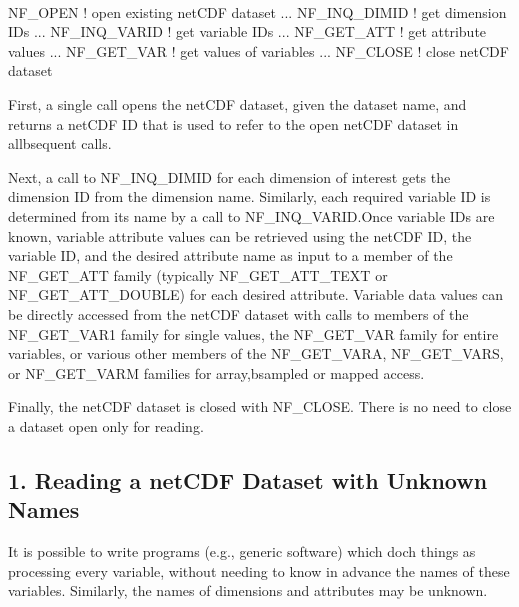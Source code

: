  

\begin{DoxyVerb}NF_OPEN               ! open existing netCDF dataset
     ...
   NF_INQ_DIMID       ! get dimension IDs
     ...
   NF_INQ_VARID       ! get variable IDs
     ...
   NF_GET_ATT         ! get attribute values
     ...
   NF_GET_VAR         ! get values of variables
     ...
NF_CLOSE              ! close netCDF dataset
\end{DoxyVerb}


First, a single call opens the net\+C\+DF dataset, given the dataset name, and returns a net\+C\+DF ID that is used to refer to the open net\+C\+DF dataset in allbsequent calls.

Next, a call to N\+F\+\_\+\+I\+N\+Q\+\_\+\+D\+I\+M\+ID for each dimension of interest gets the dimension ID from the dimension name. Similarly, each required variable ID is determined from its name by a call to N\+F\+\_\+\+I\+N\+Q\+\_\+\+V\+A\+R\+I\+D.\+Once variable I\+Ds are known, variable attribute values can be retrieved using the net\+C\+DF ID, the variable ID, and the desired attribute name as input to a member of the N\+F\+\_\+\+G\+E\+T\+\_\+\+A\+TT family (typically N\+F\+\_\+\+G\+E\+T\+\_\+\+A\+T\+T\+\_\+\+T\+E\+XT or N\+F\+\_\+\+G\+E\+T\+\_\+\+A\+T\+T\+\_\+\+D\+O\+U\+B\+LE) for each desired attribute. Variable data values can be directly accessed from the net\+C\+DF dataset with calls to members of the N\+F\+\_\+\+G\+E\+T\+\_\+\+V\+A\+R1 family for single values, the N\+F\+\_\+\+G\+E\+T\+\_\+\+V\+AR family for entire variables, or various other members of the N\+F\+\_\+\+G\+E\+T\+\_\+\+V\+A\+RA, N\+F\+\_\+\+G\+E\+T\+\_\+\+V\+A\+RS, or N\+F\+\_\+\+G\+E\+T\+\_\+\+V\+A\+RM families for array,bsampled or mapped access.

Finally, the net\+C\+DF dataset is closed with N\+F\+\_\+\+C\+L\+O\+SE. There is no need to close a dataset open only for reading.\hypertarget{nc_f77_interface_guide_f77_Reading_a_netCDF_Dataset_with_Unknown_Names}{}\subsection{1. Reading a net\+C\+D\+F Dataset with Unknown Names }\label{nc_f77_interface_guide_f77_Reading_a_netCDF_Dataset_with_Unknown_Names}
It is possible to write programs (e.\+g., generic software) which doch things as processing every variable, without needing to know in advance the names of these variables. Similarly, the names of dimensions and attributes may be unknown.

